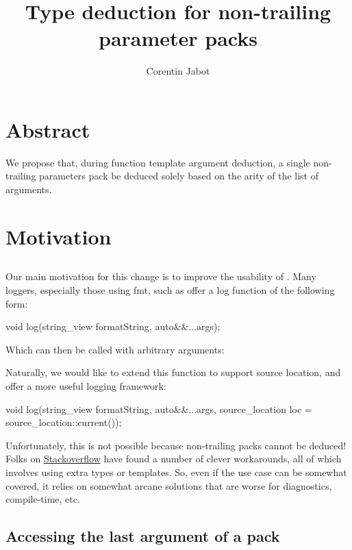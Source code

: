 \documentclass{wg21}
\title{Type deduction for non-trailing parameter packs}
\author{Corentin Jabot}{corentin.jabot@gmail.com}
\begin{document}
\maketitle

\section{Abstract}

We propose that, during function template argument deduction, a single non-trailing parameters pack be deduced solely based on the arity of the list of arguments.

\section{Motivation}

\subsection{}

Our main motivation for this change is to improve the usability of .
Many loggers, especially those using fmt, such as  offer a log function of the following form:

\begin{colorblock}
void log(string_view formatString, auto&&...args);
\end{colorblock}
Which can then be called with arbitrary arguments: 

Naturally, we would like to extend this function to support source location, and offer a more useful logging framework:

\begin{colorblock}
void log(string_view formatString, auto&&...args, source_location loc = source_location::current());
\end{colorblock}

Unfortunately, this is not possible because non-trailing packs cannot be deduced!
Folks on \href{https://stackoverflow.com/questions/57547273/how-to-use-source-location-in-a-variadic-template-function}{Stackoverflow} have found a number of clever workarounds, all of which involves using extra types or templates.
So, even if the use case can be somewhat covered, it relies on somewhat arcane solutions that are worse for diagnostics, compile-time, etc.

\subsection{Accessing the last argument of a pack}
\end{document}
